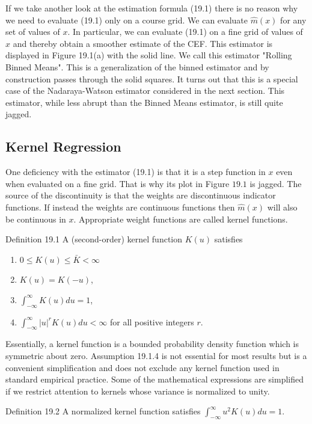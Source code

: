\documentclass[10pt]{article}
\begin{document}
If we take another look at the estimation formula (19.1) there is no reason why we need to evaluate (19.1) only on a course grid. We can evaluate $\widehat{m}(x)$ for any set of values of $x$. In particular, we can evaluate (19.1) on a fine grid of values of $x$ and thereby obtain a smoother estimate of the CEF. This estimator is displayed in Figure 19.1(a) with the solid line. We call this estimator "Rolling Binned Means". This is a generalization of the binned estimator and by construction passes through the solid squares. It turns out that this is a special case of the Nadaraya-Watson estimator considered in the next section. This estimator, while less abrupt than the Binned Means estimator, is still quite jagged.

\subsection{Kernel Regression}
One deficiency with the estimator (19.1) is that it is a step function in $x$ even when evaluated on a fine grid. That is why its plot in Figure $19.1$ is jagged. The source of the discontinuity is that the weights are discontinuous indicator functions. If instead the weights are continuous functions then $\widehat{m}(x)$ will also be continuous in $x$. Appropriate weight functions are called kernel functions.

Definition 19.1 A (second-order) kernel function $K(u)$ satisfies

\begin{enumerate}
  \item $0 \leq K(u) \leq \bar{K}<\infty$

  \item $K(u)=K(-u)$,

  \item $\int_{-\infty}^{\infty} K(u) d u=1$,

  \item $\int_{-\infty}^{\infty}|u|^{r} K(u) d u<\infty$ for all positive integers $r$.

\end{enumerate}
Essentially, a kernel function is a bounded probability density function which is symmetric about zero. Assumption 19.1.4 is not essential for most results but is a convenient simplification and does not exclude any kernel function used in standard empirical practice. Some of the mathematical expressions are simplified if we restrict attention to kernels whose variance is normalized to unity.

Definition 19.2 A normalized kernel function satisfies $\int_{-\infty}^{\infty} u^{2} K(u) d u=1$.
\end{document}
